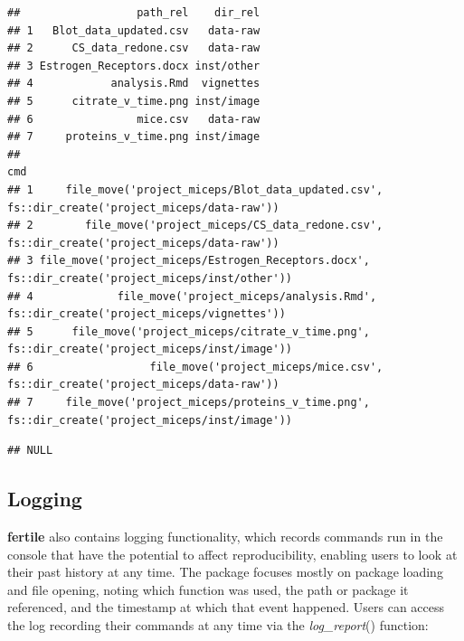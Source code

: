 \documentclass[APA,LATO1COL]{WileyNJD-v2}\usepackage[]{graphicx}\usepackage[]{color}
\makeatletter
\newenvironment{kframe}{%
 \def\at@end@of@kframe{}%
 \ifinner\ifhmode%
  \def\at@end@of@kframe{\end{minipage}}%
  \begin{minipage}{\columnwidth}%
 \fi\fi%
 \def\FrameCommand##1{\hskip\@totalleftmargin \hskip-\fboxsep
 \colorbox{shadecolor}{##1}\hskip-\fboxsep
     \hskip-\linewidth \hskip-\@totalleftmargin \hskip\columnwidth}%
 \MakeFramed {\advance\hsize-\width
   \@totalleftmargin\z@ \linewidth\hsize
   \@setminipage}}%
 {\par\unskip\endMakeFramed%
 \at@end@of@kframe}
\newenvironment{knitrout}{}{} %
\newcommand{\pkg}[1]{\textbf{#1}}
\newcommand{\func}[1]{\textit{#1}()}
\makeatother
\begin{document}
\begin{knitrout}
\begin{kframe}
{\ttfamily\noindent\itshape\color{messagecolor}{\#\# --\ \  Suggestions for moving files ------------------------------------------- fertile 0.0.0.9027 --}}\begin{verbatim}
##                  path_rel    dir_rel
## 1   Blot_data_updated.csv   data-raw
## 2      CS_data_redone.csv   data-raw
## 3 Estrogen_Receptors.docx inst/other
## 4            analysis.Rmd  vignettes
## 5      citrate_v_time.png inst/image
## 6                mice.csv   data-raw
## 7     proteins_v_time.png inst/image
##                                                                                                cmd
## 1     file_move('project_miceps/Blot_data_updated.csv', fs::dir_create('project_miceps/data-raw'))
## 2        file_move('project_miceps/CS_data_redone.csv', fs::dir_create('project_miceps/data-raw'))
## 3 file_move('project_miceps/Estrogen_Receptors.docx', fs::dir_create('project_miceps/inst/other'))
## 4             file_move('project_miceps/analysis.Rmd', fs::dir_create('project_miceps/vignettes'))
## 5      file_move('project_miceps/citrate_v_time.png', fs::dir_create('project_miceps/inst/image'))
## 6                  file_move('project_miceps/mice.csv', fs::dir_create('project_miceps/data-raw'))
## 7     file_move('project_miceps/proteins_v_time.png', fs::dir_create('project_miceps/inst/image'))
\end{verbatim}


{\ttfamily\noindent\itshape\color{messagecolor}{\#\# --\ \  Problematic paths logged ----------------------------------------------- fertile 0.0.0.9027 --}}\begin{verbatim}
## NULL
\end{verbatim}
\end{kframe}
\end{knitrout}

\subsection{Logging}

\pkg{fertile} also contains logging functionality, which records commands run in the console that have the potential to affect reproducibility, enabling users to look at their past history at any time. The package focuses mostly on package loading and file opening, noting which function was used, the path or package it referenced, and the timestamp at which that event happened. Users can access the log recording their commands at any time via the \func{log\_report} function:
\end{document}
